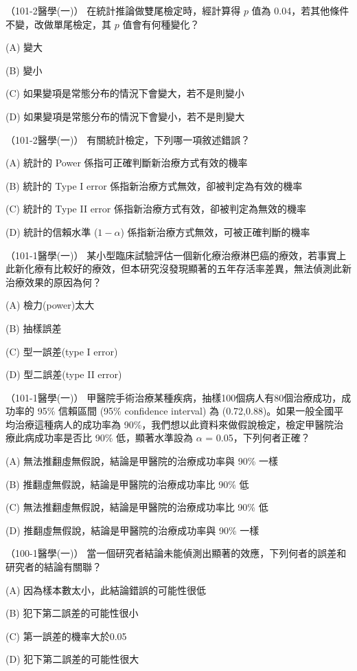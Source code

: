     \begin{docexam}{（101-2醫學(一)）}
        在統計推論做雙尾檢定時，經計算得 $p$ 值為 0.04，若其他條件不變，改做單尾檢定，其 $p$ 值會有何種變化？

        (A) 變大

        (B) 變小

        (C) 如果變項是常態分布的情況下會變大，若不是則變小

        (D) 如果變項是常態分布的情況下會變小，若不是則變大
    \end{docexam}
    
    \begin{docexam}{（101-2醫學(一)）}
        有關統計檢定，下列哪一項敘述錯誤？

        (A) 統計的 Power 係指可正確判斷新治療方式有效的機率

        (B) 統計的 Type I error 係指新治療方式無效，卻被判定為有效的機率

        (C) 統計的 Type II error 係指新治療方式有效，卻被判定為無效的機率

        (D) 統計的信賴水準 ($1-\alpha$) 係指新治療方式無效，可被正確判斷的機率
    \end{docexam}
    
    \begin{docexam}{（101-1醫學(一)）}
        某小型臨床試驗評估一個新化療治療淋巴癌的療效，若事實上此新化療有比較好的療效，但本研究沒發現顯著的五年存活率差異，無法偵測此新治療效果的原因為何？

        (A) 檢力(power)太大

        (B) 抽樣誤差

        (C) 型一誤差(type I error)

        (D) 型二誤差(type II error)
    \end{docexam}
    
    \begin{docexam}{（101-1醫學(一)）}
        甲醫院手術治療某種疾病，抽樣100個病人有80個治療成功，成功率的 95\% 信賴區間 (95\% confidence interval) 為 (0.72,0.88)。如果一般全國平均治療這種病人的成功率為 90\%，我們想以此資料來做假說檢定，檢定甲醫院治療此病成功率是否比 90\% 低，顯著水準設為 $\alpha$ = 0.05，下列何者正確？

        (A) 無法推翻虛無假說，結論是甲醫院的治療成功率與 90\% 一樣

        (B) 推翻虛無假說，結論是甲醫院的治療成功率比 90\% 低

        (C) 無法推翻虛無假說，結論是甲醫院的治療成功率比 90\% 低

        (D) 推翻虛無假說，結論是甲醫院的治療成功率與 90\% 一樣
    \end{docexam}
    
    \begin{docexam}{（100-1醫學(一)）}
        當一個研究者結論未能偵測出顯著的效應，下列何者的誤差和研究者的結論有關聯？

        (A) 因為樣本數太小，此結論錯誤的可能性很低

        (B) 犯下第二誤差的可能性很小

        (C) 第一誤差的機率大於0.05

        (D) 犯下第二誤差的可能性很大
    \end{docexam}
    